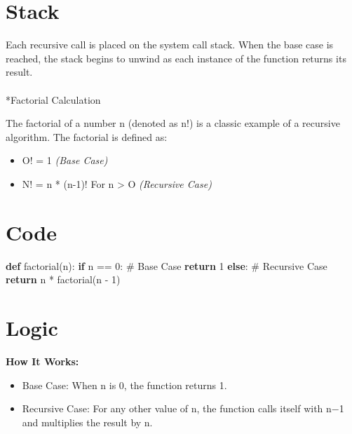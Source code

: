 \documentclass[
  letterpaper,
  DIV=11,
  numbers=noendperiod]{scrreprt}
\makeatletter
\let\oldparagraph\paragraph
\renewcommand{\paragraph}{
    \@ifstar
      \xxxParagraphStar
      \xxxParagraphNoStar
  }
\newcommand{\xxxParagraphStar}[1]{\oldparagraph*{#1}\mbox{}}
\newcommand{\xxxParagraphNoStar}[1]{\oldparagraph{#1}\mbox{}}
\newenvironment{Shaded}{\begin{snugshade}}{\end{snugshade}}
\newcommand{\CommentTok}[1]{\textcolor[rgb]{0.37,0.37,0.37}{#1}}
\newcommand{\ControlFlowTok}[1]{\textcolor[rgb]{0.00,0.23,0.31}{\textbf{#1}}}
\newcommand{\DecValTok}[1]{\textcolor[rgb]{0.68,0.00,0.00}{#1}}
\newcommand{\KeywordTok}[1]{\textcolor[rgb]{0.00,0.23,0.31}{\textbf{#1}}}
\newcommand{\NormalTok}[1]{\textcolor[rgb]{0.00,0.23,0.31}{#1}}
\newcommand{\OperatorTok}[1]{\textcolor[rgb]{0.37,0.37,0.37}{#1}}
\providecommand{\tightlist}{%
  \setlength{\itemsep}{0pt}\setlength{\parskip}{0pt}}
\makeatother
\begin{document}
\section{Stack}

Each recursive call is placed on the system call stack. When the base
case is reached, the stack begins to unwind as each instance of the
function returns its result.

\paragraph*{Factorial Calculation}\label{factorial-calculation}

The factorial of a number n (denoted as n!) is a classic example of a
recursive algorithm. The factorial is defined as:

\begin{itemize}
\tightlist
\item
  O! = 1 \emph{(Base Case)}
\item
  N! = n * (n-1)! For n \textgreater{} O \emph{(Recursive Case)}
\end{itemize}

\section{Code}

\begin{Shaded}
\begin{Highlighting}[]
\KeywordTok{def}\NormalTok{ factorial(n):}
    \ControlFlowTok{if}\NormalTok{ n }\OperatorTok{==} \DecValTok{0}\NormalTok{:  }\CommentTok{\# Base Case}
        \ControlFlowTok{return} \DecValTok{1}
    \ControlFlowTok{else}\NormalTok{:  }\CommentTok{\# Recursive Case}
        \ControlFlowTok{return}\NormalTok{ n }\OperatorTok{*}\NormalTok{ factorial(n }\OperatorTok{{-}} \DecValTok{1}\NormalTok{)}
\end{Highlighting}
\end{Shaded}

\section{Logic}

\textbf{How It Works:}

\begin{itemize}
\tightlist
\item
  Base Case: When n is 0, the function returns 1.
\item
  Recursive Case: For any other value of n, the function calls itself
  with n−1 and multiplies the result by n.
\end{itemize}
\end{document}
